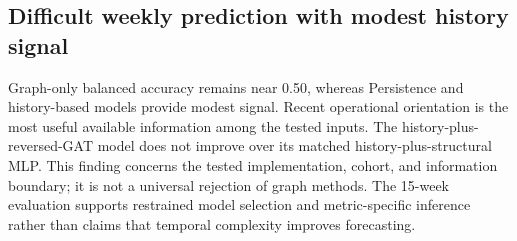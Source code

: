 \documentclass[11pt,a4paper]{article}
\begin{document}
\subsection{Difficult weekly prediction with modest history signal}
Graph-only balanced accuracy remains near 0.50, whereas Persistence and history-based models provide modest signal. Recent operational orientation is the most useful available information among the tested inputs. The history-plus-reversed-GAT model does not improve over its matched history-plus-structural MLP. This finding concerns the tested implementation, cohort, and information boundary; it is not a universal rejection of graph methods. The 15-week evaluation supports restrained model selection and metric-specific inference rather than claims that temporal complexity improves forecasting.
\end{document}
